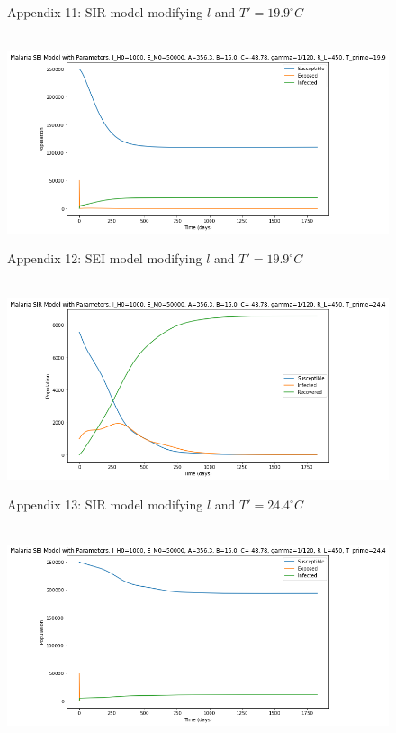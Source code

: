 \documentclass[
	12pt,				%
	oneside,			%
	a4paper,			%
	english,			%
	brazil				%
	]{abntex2}
\begin{document}
\begin{apendicesenv}
\begin{figure}[!ht]
	\caption*{Appendix 11: SIR model modifying $l$ and $T'=19.9^\circ C$}
\end{figure} 
\begin{figure}[!ht]
	\centering
	\hbox{\hspace{-1.0em} \includegraphics[scale=0.6] {THESIS-SEI_Correcao_l_b3_T_linha_19_9.png}}
	\caption*{Appendix 12: SEI model modifying $l$ and $T'=19.9^\circ C$}
\end{figure}
\newpage
\begin{figure}[!ht]
	\centering
	\hbox{\hspace{-1.2em} \includegraphics[scale=0.6] {THESIS-SIR_Correcao_l_b3_T_linha_24_4.png}}
	\caption*{Appendix 13: SIR model modifying $l$ and $T'=24.4^\circ C$}
\end{figure} 
\begin{figure}[!ht]
	\centering
	\hbox{\hspace{-1.0em} \includegraphics[scale=0.6] {THESIS-SEI_Correcao_l_b3_T_linha_24_4.png}}

\end{figure}
\end{apendicesenv}
\end{document}

